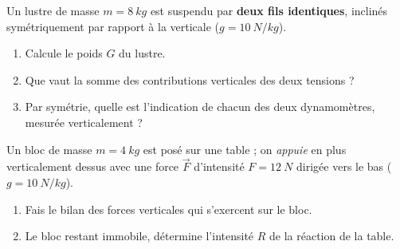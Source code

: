 \documentclass[11pt,a4paper]{article}
\newcommand{\vv}[1]{\vec{#1}}\newcommand{\ds}{\displaystyle}
\begin{document}
\begin{exo}
Un lustre de masse $m=\qty{8}{kg}$ est suspendu par \textbf{deux fils identiques}, inclinés
symétriquement par rapport à la verticale ($g=\qty{10}{N/kg}$).
\begin{center}
\end{center}
\begin{enumerate}[label=\alph*)]
  \item Calcule le poids $G$ du lustre.
  \item Que vaut la somme des contributions verticales des deux tensions ?
  \item Par symétrie, quelle est l'indication de chacun des deux dynamomètres, mesurée verticalement ?
\end{enumerate}
\end{exo}

\begin{exo}
Un bloc de masse $m=\qty{4}{kg}$ est posé sur une table ; on \emph{appuie} en plus verticalement
dessus avec une force $\vv F$ d'intensité $F=\qty{12}{N}$ dirigée vers le bas ($g=\qty{10}{N/kg}$).
\begin{enumerate}[label=\alph*)]
  \item Fais le bilan des forces verticales qui s'exercent sur le bloc.
  \item Le bloc restant immobile, détermine l'intensité $R$ de la réaction de la table.
\end{enumerate}
\end{exo}
\end{document}
